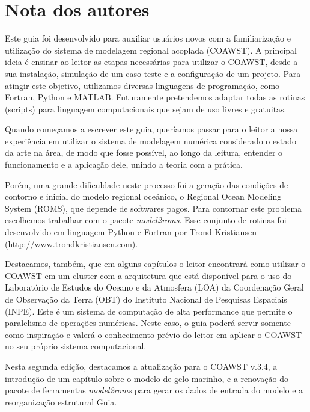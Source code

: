 \chapter*{Nota dos autores}
\bigskip
\noindent Este guia foi desenvolvido para auxiliar usuários novos com a familiarização e utilização do sistema 
          de modelagem regional acoplada (COAWST). A principal ideia é ensinar ao leitor as etapas necessárias 
          para utilizar o COAWST, desde a sua instalação, simulação de um caso teste e a configuração de um 
          projeto. Para atingir este objetivo, utilizamos diversas linguagens de programação, como Fortran, 
          Python e MATLAB. Futuramente pretendemos adaptar todas as rotinas (scripts) para linguagem computacionais 
          que sejam de uso livres e gratuitas.
\bigskip

\noindent Quando começamos a escrever este guia, queríamos passar para o leitor a nossa experiência em utilizar o 
          sistema de modelagem numérica considerado o estado da arte na área, de modo que fosse possível, ao longo 
          da leitura, entender o funcionamento e a aplicação dele, unindo a teoria com a prática.
\bigskip

\noindent Porém, uma grande dificuldade neste processo foi a geração das condições de contorno e inicial do modelo 
          regional oceânico, o Regional Ocean Modeling System (ROMS), que depende de softwares pagos. Para contornar este 
          problema escolhemos trabalhar com o pacote \textit{model2roms}. Esse conjunto de rotinas foi desenvolvido 
          em linguagem Python e Fortran por Trond Kristiansen 
          (\textcolor{bleu_cite}{\href{http://www.trondkristiansen.com}{http://www.trondkristiansen.com}}).
\bigskip

\noindent Destacamos, também, que em alguns capítulos o leitor encontrará como utilizar o COAWST em um cluster com
          a arquitetura que está disponível para o uso do Laboratório de Estudos do Oceano e da Atmosfera (LOA) da Coordenação
          Geral de Observação da Terra (OBT) do Instituto Nacional de Pesquisas Espaciais (INPE). Este é um sistema de 
          computação de alta performance que permite o paralelismo de operações numéricas. Neste caso, o guia poderá servir 
          somente como inspiração e valerá o conhecimento prévio do leitor em aplicar o COAWST no seu próprio sistema computacional.
\bigskip

\noindent Nesta segunda edição, destacamos a atualização para o COAWST v.3.4, a introdução de um capítulo sobre
          o modelo de gelo marinho, e a renovação do pacote de ferramentas \textit{model2roms} para 
          gerar os dados de entrada do modelo e a reorganização estrutural Guia.
\bigskip
\bigskip

